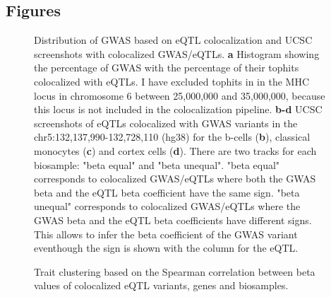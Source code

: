 \begin{backmatter}

\section*{Figures}

%
%

\begin{figure}[!ht]
    \caption{Distribution of GWAS based on eQTL colocalization and UCSC screenshots with colocalized GWAS/eQTLs.
    \textbf{a} Histogram showing the percentage of GWAS with the percentage of their tophits colocalized with eQTLs.
    I have excluded tophits in in the MHC locus in chromosome 6 between 25,000,000 and 35,000,000,
    because this locus is not included in the colocalization pipeline.
    \textbf{b-d} UCSC screenshots of eQTLs colocalized with GWAS variants in the chr5:132,137,990-132,728,110 (hg38)
    for the b-cells (\textbf{b}), classical monocytes (\textbf{c}) and cortex cells (\textbf{d}).
    There are two tracks for each biosample: "beta equal" and "beta unequal".
    "beta equal" corresponds to colocalized GWAS/eQTLs where both the GWAS beta and the eQTL beta coefficient have the same sign.
    "beta unequal" corresponds to colocalized GWAS/eQTLs where the GWAS beta and the eQTL beta coefficients have different signs.
    This allows to infer the beta coefficient of the GWAS variant eventhough the sign is shown with the column for the eQTL.
    }
    \label{fig:1}
\end{figure}

%
%

\begin{figure}[!ht]
    \caption{
    Trait clustering based on the Spearman correlation between beta values of colocalized eQTL variants, genes and biosamples.
    }
    \label{fig:2}
\end{figure}

%
%


\end{backmatter}

